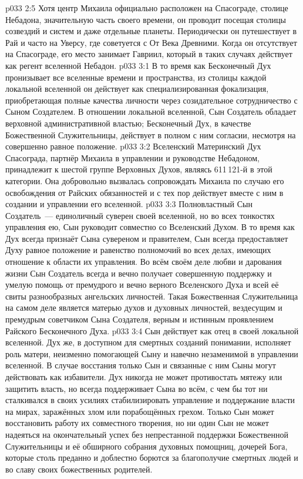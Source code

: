\vs p033 2:5 \pc Хотя центр Михаила официально расположен на Спасограде, столице Небадона, значительную часть своего времени, он проводит посещая столицы созвездий и систем и даже отдельные планеты. Периодически он путешествует в Рай и часто на Уверсу, где советуется с От Века Древними. Когда он отсутствует на Спасограде, его место занимает Гавриил, который в таких случаях действует как регент вселенной Небадон.
\vs p033 3:1 В то время как Бесконечный Дух пронизывает все вселенные времени и пространства, из столицы каждой локальной вселенной он действует как специализированная фокализация, приобретающая полные качества личности через созидательное сотрудничество с Сыном Создателем. В отношении локальной вселенной, Сын Создатель обладает верховной административной властью; Бесконечный Дух, в качестве Божественной Служительницы, действует в полном с ним согласии, несмотря на совершенно равное положение.
\vs p033 3:2 \pc Вселенский Материнский Дух Спасограда, партнёр Михаила в управлении и руководстве Небадоном, принадлежит к шестой группе Верховных Духов, являясь 611\,121-й в этой категории. Она добровольно вызвалась сопровождать Михаила по случаю его освобождения от Райских обязанностей и с тех пор действует вместе с ним в создании и управлении его вселенной.
\vs p033 3:3 \pc Полновластный Сын Создатель~--- единоличный суверен своей вселенной, но во всех тонкостях управления ею, Сын руководит совместно со Вселенский Духом. В то время как Дух всегда признаёт Сына сувереном и правителем, Сын всегда предоставляет Духу равное положение и равенство полномочий во всех делах, имеющих отношение к области их управления. Во всём своём деле любви и дарования жизни Сын Создатель всегда и вечно получает совершенную поддержку и умелую помощь от премудрого и вечно верного Вселенского Духа и всей её свиты разнообразных ангельских личностей. Такая Божественная Служительница на самом деле является матерью духов и духовных личностей, вездесущим и премудрым советчиком Сына Создателя, верным и истинным проявлением Райского Бесконечного Духа.
\vs p033 3:4 \pc Сын действует как отец в своей локальной вселенной. Дух же, в доступном для смертных созданий понимании, исполняет роль матери, неизменно помогающей Сыну и навечно незаменимой в управлении вселенной. В случае восстания только Сын и связанные с ним Сыны могут действовать как избавители. Дух никогда не может противостать мятежу или защитить власть, но всегда поддерживает Сына во всём, с чем бы тот ни сталкивался в своих усилиях стабилизировать управление и поддержание власти на мирах, заражённых злом или порабощённых грехом. Только Сын может восстановить работу их совместного творения, но ни один Сын не может надеяться на окончательный успех без непрестанной поддержки Божественной Служительницы и её обширного собрания духовных помощниц, дочерей Бога, которые столь преданно и доблестно борются за благополучие смертных людей и во славу своих божественных родителей.
